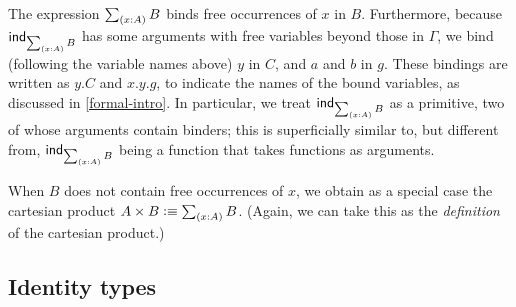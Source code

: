 
The expression $\tsm{x:A} B$ binds free occurrences of $x$ in $B$. Furthermore, because
$\ind{\tsm{x:A} B}$ has some arguments with free variables beyond those in $\Gamma$,
we bind (following the variable names above) $y$ in $C$, and $a$ and $b$ in $g$.
These bindings are written as $y.C$ and $x.y.g$, to indicate the names of the bound
variables, as discussed in \autoref{formal-intro}. In particular, we treat $\ind{\tsm{x:A} B}$ as a primitive,
two of whose arguments contain binders; this is superficially similar to, but
different from, $\ind{\tsm{x:A} B}$ being a function that takes functions as
arguments.

When $B$ does not contain free occurrences of $x$, we obtain as a special case
the cartesian product $A \times B \defeq \tsm{x:A} B$. (Again, we can take this
as the \emph{definition} of the cartesian product.)

\subsection{Identity types}

